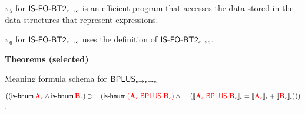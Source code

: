 \begin{biformthy}
    \item $\pi_5$ for $\mbox{\sf IS-FO-BT2}_{\epsilon \rightarrow \epsilon}$
      is an efficient program that accesses the data stored in the
      data structures that represent expressions.

    \item $\pi_6$ for $\mbox{\sf IS-FO-BT2}_{\epsilon \rightarrow \epsilon}$
      uses the definition of $\mbox{\sf IS-FO-BT2}_{\epsilon \rightarrow
        \epsilon}$.

  \ee
    
  \item[] \textbf{Theorems (selected)}

    \be

      \setcounter{enumi}{0}

      \item Meaning formula schema for 
      $\mbox{\sf BPLUS}_{\epsilon \rightarrow \epsilon \rightarrow \epsilon}$

      $((\mbox{\sf is-bnum} \, \textcolor{red}{\textbf{A}_\epsilon} \wedge 
      \mbox{\sf is-bnum} \, \textcolor{red}{\textbf{B}_\epsilon}) 
      \supset {}\\
      \hspace*{2ex}(\mbox{\sf is-bnum} \, 
      \textcolor{red}{(\textbf{A}_\epsilon \; \mbox{\sf BPLUS} \; \textbf{B}_\epsilon)} \wedge {}\\
      \hspace*{2.8ex}(\llbracket\textcolor{red}{\textbf{A}_\epsilon \; \mbox{\sf BPLUS} \; 
      \textbf{B}_\epsilon}\rrbracket_\iota = 
      \llbracket\textcolor{red}{\textbf{A}_\epsilon}\rrbracket_\iota + 
      \llbracket\textcolor{red}{\textbf{B}_\epsilon}\rrbracket_\iota)))$.

    \ee

\ei
\end{biformthy}

